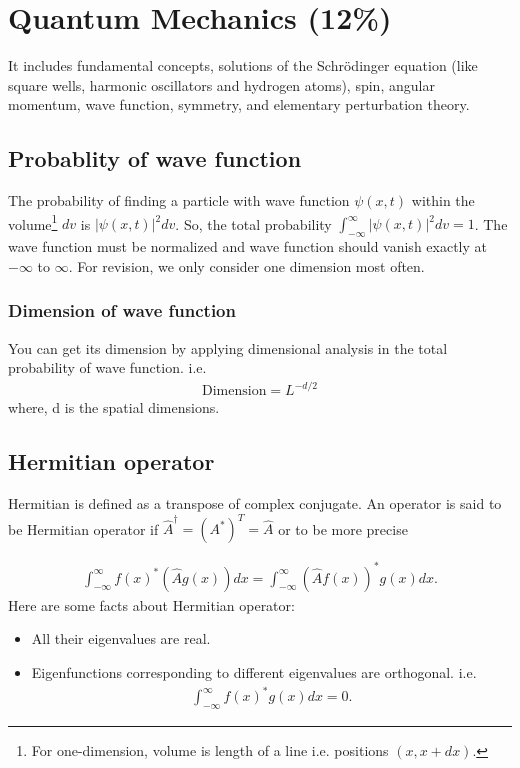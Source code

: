 
\section{Quantum Mechanics (12\%)}

It includes fundamental concepts, solutions of the Schr\"{o}dinger equation (like square wells, harmonic oscillators and hydrogen atoms), spin, angular momentum, wave function, symmetry, and elementary perturbation theory.

\subsection{Probablity of wave function}
The probability of finding a particle with wave function $\psi(x,t)$ within the volume\footnote{For one-dimension, volume is length of a line i.e. positions $(x, x+dx)$.} $dv$ is $|\psi(x,t)|^{2}dv$. So, the total probability $\int_{-\infty}^{\infty} |\psi(x,t)|^{2}dv = 1$. The wave function must be normalized and wave function should vanish exactly at $-\infty$ to $\infty$. For revision, we only consider one dimension most often.

\subsubsection{Dimension of wave function}
You can get its dimension by applying dimensional analysis in the total probability of wave function. i.e.
\begin{align}
\text{Dimension} = L^{-d/2}
\end{align}
where, d is the spatial dimensions. 

\subsection{Hermitian operator}
Hermitian is defined as a transpose of complex conjugate. An operator is said to be Hermitian operator if $\hat{A}^{\dagger} = (A^{*})^{T}= \hat{A}$ or to be more precise

\begin{align}
\int_{-\infty}^{\infty} f(x)^{*} (\hat{A} g(x)) dx = \int_{-\infty}^{\infty} (\hat{A} f(x))^{*} g(x) dx.
\end{align}
Here are some facts about Hermitian operator:
\begin{itemize}
\item All their eigenvalues are real.
\item Eigenfunctions corresponding to different eigenvalues are orthogonal. i.e.
\begin{align*}
\int_{-\infty}^{\infty} f(x)^{*} g(x) dx = 0. 
\end{align*}
\end{itemize}

